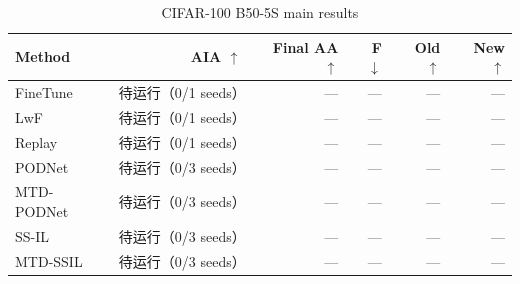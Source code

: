 \begin{table}[htbp]
\centering
\caption{CIFAR-100 B50-5S main results}
\label{tab:main}
\begin{tabular}{lrrrrr}
\toprule
Method & AIA $\uparrow$ & Final AA $\uparrow$ & F $\downarrow$ & Old $\uparrow$ & New $\uparrow$ \\ 
\midrule
FineTune & 待运行（0/1 seeds） & — & — & — & — \\
LwF & 待运行（0/1 seeds） & — & — & — & — \\
Replay & 待运行（0/1 seeds） & — & — & — & — \\
PODNet & 待运行（0/3 seeds） & — & — & — & — \\
MTD-PODNet & 待运行（0/3 seeds） & — & — & — & — \\
SS-IL & 待运行（0/3 seeds） & — & — & — & — \\
MTD-SSIL & 待运行（0/3 seeds） & — & — & — & — \\
\bottomrule
\end{tabular}
\end{table}
